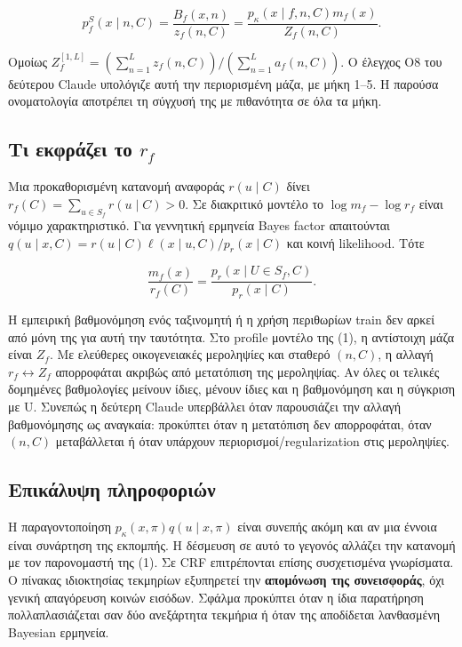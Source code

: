 \documentclass[
  10pt,
  a4paper,
]{report}
\begin{document}
\[
p^S_f(x\mid n,C)=\frac{B_f(x,n)}{z_f(n,C)}
=\frac{p_\kappa(x\mid f,n,C)m_f(x)}{Z_f(n,C)}.\tag{1}
\]

Ομοίως \(Z_f^{[1,L]}=(\sum_{n=1}^L z_f(n,C))/(\sum_{n=1}^La_f(n,C))\). Ο
έλεγχος O8 του δεύτερου Claude υπολόγιζε αυτή την περιορισμένη μάζα, με
μήκη 1--5. Η παρούσα ονοματολογία αποτρέπει τη σύγχυσή της με πιθανότητα
σε όλα τα μήκη.

\subsection{\texorpdfstring{Τι εκφράζει το
\(r_f\)}{Τι εκφράζει το r\_f}}\label{ux3c4ux3b9-ux3b5ux3baux3c6ux3c1ux3acux3b6ux3b5ux3b9-ux3c4ux3bf-r_f}

Μια προκαθορισμένη κατανομή αναφοράς \(r(u\mid C)\) δίνει
\(r_f(C)=\sum_{u\in S_f}r(u\mid C)>0\). Σε διακριτικό μοντέλο το
\(\log m_f-\log r_f\) είναι νόμιμο χαρακτηριστικό. Για γεννητική
ερμηνεία Bayes factor απαιτούνται
\(q(u\mid x,C)=r(u\mid C)\ell(x\mid u,C)/p_r(x\mid C)\) και κοινή
likelihood. Τότε

\[
\frac{m_f(x)}{r_f(C)}=\frac{p_r(x\mid U\in S_f,C)}{p_r(x\mid C)}.
\]

Η εμπειρική βαθμονόμηση ενός ταξινομητή ή η χρήση περιθωρίων train δεν
αρκεί από μόνη της για αυτή την ταυτότητα. Στο profile μοντέλο της (1),
η αντίστοιχη μάζα είναι \(Z_f\). Με ελεύθερες οικογενειακές μεροληψίες
και σταθερό \((n,C)\), η αλλαγή \(r_f\leftrightarrow Z_f\) απορροφάται
ακριβώς από μετατόπιση της μεροληψίας. Αν όλες οι τελικές δομημένες
βαθμολογίες μείνουν ίδιες, μένουν ίδιες και η βαθμονόμηση και η σύγκριση
με U. Συνεπώς η δεύτερη Claude υπερβάλλει όταν παρουσιάζει την αλλαγή
βαθμονόμησης ως αναγκαία: προκύπτει όταν η μετατόπιση δεν απορροφάται,
όταν \((n,C)\) μεταβάλλεται ή όταν υπάρχουν περιορισμοί/regularization
στις μεροληψίες.

\subsection{Επικάλυψη
πληροφοριών}\label{ux3b5ux3c0ux3b9ux3baux3acux3bbux3c5ux3c8ux3b7-ux3c0ux3bbux3b7ux3c1ux3bfux3c6ux3bfux3c1ux3b9ux3ceux3bd}

Η παραγοντοποίηση \(p_\kappa(x,\pi)q(u\mid x,\pi)\) είναι συνεπής ακόμη
και αν μια έννοια είναι συνάρτηση της εκπομπής. Η δέσμευση σε αυτό το
γεγονός αλλάζει την κατανομή με τον παρονομαστή της (1). Σε CRF
επιτρέπονται επίσης συσχετισμένα γνωρίσματα. Ο πίνακας ιδιοκτησίας
τεκμηρίων εξυπηρετεί την \textbf{απομόνωση της συνεισφοράς}, όχι γενική
απαγόρευση κοινών εισόδων. Σφάλμα προκύπτει όταν η ίδια παρατήρηση
πολλαπλασιάζεται σαν δύο ανεξάρτητα τεκμήρια ή όταν της αποδίδεται
λανθασμένη Bayesian ερμηνεία.
\end{document}
